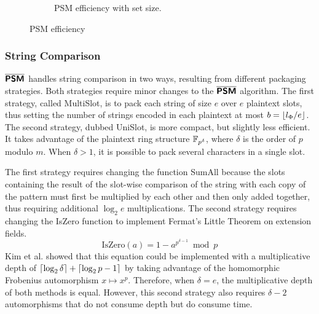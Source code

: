 \begin{figure*}[htbp]
\begin{subfigure}{.33\textwidth}
\caption{PSM efficiency with set size.}
\label{fig:searchspace}
\end{subfigure}
\caption{PSM efficiency}
\end{figure*}

\subsubsection{String Comparison}
$\overline{\textsf{\textbf{PSM}}}$ handles string comparison in two ways, resulting from different packaging strategies. Both strategies require minor changes to the $\overline{\textsf{\textbf{PSM}}}$ algorithm. The first strategy, called MultiSlot, is to pack each string of size $e$ over $e$ plaintext slots, thus setting the number of strings encoded in each plaintext at most $b=\left\lfloor l_{\Phi}/e \right\rfloor$. The second strategy, dubbed UniSlot, is more compact, but slightly less efficient. It takes advantage of the plaintext ring structure $\mathbb{F}_{p^{\delta}}$, where $\delta$ is the order of $p$ modulo $m$. When $\delta>1$, it is possible to pack several characters in a single slot.

The first strategy requires changing the function {\sc SumAll} because the slots containing the result of the slot-wise comparison of the string with each copy of the pattern must first be multiplied by each other and then only added together, thus requiring additional $\log_2{e}$ multiplications. The second strategy requires changing the {\sc IsZero} function to implement Fermat's Little Theorem on extension fields.
\begin{equation}\label{eq:iszero+}
    \mathrm{IsZero}(a) = 1 - a^{p^{\delta-1}} \bmod p
\end{equation}
Kim et al. \cite{kimEfficiencyFHEbasedPrivate2016} showed that this equation could be implemented with a multiplicative depth of $\left\lceil \log_2{\delta} \right\rceil+\left\lceil \log_2{p-1} \right\rceil$ by taking advantage of the homomorphic Frobenius automorphism $x \mapsto x^{p}$. Therefore, when $\delta=e$, the multiplicative depth of both methods is equal. However, this second strategy also requires $\delta-2$ automorphisms that do not consume depth but do consume time.

